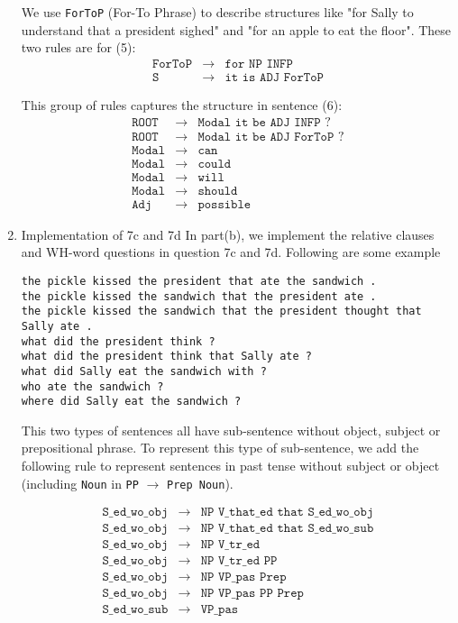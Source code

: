 \documentclass[11pt]{article}
\newcommand{\code}[1]{\texttt{#1}}
\begin{document}
\begin{enumerate}
We use \code{ForToP} (For-To Phrase) to describe structures like "for Sally to understand that a president sighed" and "for an apple to eat the floor". These two rules are for (5):
\begin{eqnarray*}
\code{ForToP} &\to& \code{for NP INFP }\\
\code{S} &\to& \code{it is ADJ ForToP}
\end{eqnarray*}

This group of rules captures the structure in sentence (6):
\begin{eqnarray*}
\code{ROOT} &\to&  \code{Modal it be ADJ INFP ?}\\
\code{ROOT} &\to&  \code{Modal it be ADJ ForToP ?}\\
\code{Modal}  &\to& \code{can}\\
\code{Modal} &\to&  \code{could}\\
\code{Modal} &\to&  \code{will}\\
\code{Modal} &\to&  \code{should}\\
\code{Adj}   &\to&  \code{possible}
\end{eqnarray*}

\item Implementation of 7c and 7d
In part(b), we implement the relative clauses and WH-word questions in
question 7c and 7d. Following are some example
\begin{lstlisting}
the pickle kissed the president that ate the sandwich .
the pickle kissed the sandwich that the president ate .
the pickle kissed the sandwich that the president thought that Sally ate .
what did the president think ?
what did the president think that Sally ate ?
what did Sally eat the sandwich with ?
who ate the sandwich ?
where did Sally eat the sandwich ?
\end{lstlisting}

This two types of sentences all have sub-sentence without object, subject or
prepositional phrase. To represent this type of sub-sentence, we add
the following rule to represent sentences in past tense without subject or
object (including \code{Noun} in \code{PP} $\to$ \code{Prep Noun}).

\begin{eqnarray*}
\code{S\_ed\_wo\_obj} &\to&  \code{NP V\_that\_ed that S\_ed\_wo\_obj}\\
\code{S\_ed\_wo\_obj} &\to&  \code{NP V\_that\_ed that S\_ed\_wo\_sub}\\
\code{S\_ed\_wo\_obj} &\to&  \code{NP V\_tr\_ed}\\
\code{S\_ed\_wo\_obj} &\to&  \code{NP V\_tr\_ed PP}\\
\code{S\_ed\_wo\_obj} &\to&  \code{NP VP\_pas Prep}\\
\code{S\_ed\_wo\_obj} &\to&  \code{NP VP\_pas PP Prep}\\
\code{S\_ed\_wo\_sub} &\to&  \code{VP\_pas}\\
\end{eqnarray*}


\end{enumerate}
\end{document}
